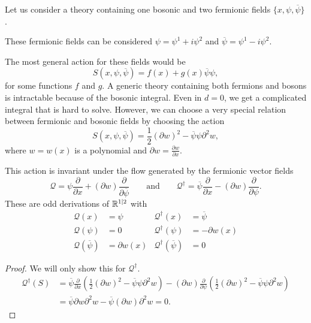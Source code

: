Let us consider a theory containing one bosonic and two fermionic fields $\{x, \psi, \overline{\psi}\}$.
\begin{leftbar}
  These fermionic fields can be considered $\psi = \psi^1 + i \psi^2$ and $\overline{\psi} = \psi^1 - i \psi^2$.
\end{leftbar}
The most general action for these fields would be
\begin{equation}
  S(x, \psi, \overline{\psi}) = f(x) + g(x) \overline{\psi} \psi,
\end{equation}
for some functions $f$ and $g$.
A generic theory containing both fermions and bosons is intractable because of the bosonic integral. Even in $d = 0$, we get a complicated integral that is hard to solve.
However, we can choose a very special relation between fermionic and bosonic fields by choosing the action
\begin{equation}
  S(x, \psi, \overline{\psi}) = \frac{1}{2}(\partial w)^2 - \overline{\psi} \psi \partial^2 w,
\end{equation}
where $w = w(x)$ is a polynomial and $\partial w = \frac{\partial w}{\partial x}$.
\begin{claim}
  This action is invariant under the flow generated by the fermionic vector fields
  \begin{equation}
    \mathcal{Q} = \psi \frac{\partial }{\partial x} + (\partial w) \frac{\partial }{\partial \overline{\psi}} \qquad \text{and} \qquad \mathcal{Q}^{\dagger} = \overline{\psi} \frac{\partial }{\partial x} - (\partial w) \frac{\partial }{\partial \psi}.
  \end{equation}
  These are odd derivations of $\mathbb{R}^{1 \suchthat 2}$ with 
  \begin{align}
    \mathcal{Q}(x) &= \psi & \mathcal{Q}^{\dagger}(x) &= \overline{\psi} \\
    \mathcal{Q}(\psi) &= 0 &  \mathcal{Q}^{\dagger}(\psi) &= -\partial w (x) \\
    \mathcal{Q}(\overline{\psi}) &= \partial w (x) & \mathcal{Q}^{\dagger}(\overline{\psi}) &= 0
  \end{align}
\end{claim}
\begin{proof}
  We will only show this for $\mathcal{Q}^{\dagger}$.
  \begin{align}
    \mathcal{Q}^{\dagger}(S) &= \overline{\psi} \frac{\partial }{\partial x} \left( \frac{1}{2} (\partial w)^2 - \overline{\psi} \psi \partial^2 w \right) - (\partial w) \frac{\partial }{\partial \psi} \left( \frac{1}{2} (\partial w)^2 - \overline{\psi} \psi \partial^2 w \right) \\
			     &= \overline{\psi} \partial w \partial^2 w - \overline{\psi} (\partial w) \partial^2 w = 0.
  \end{align}
\end{proof}
